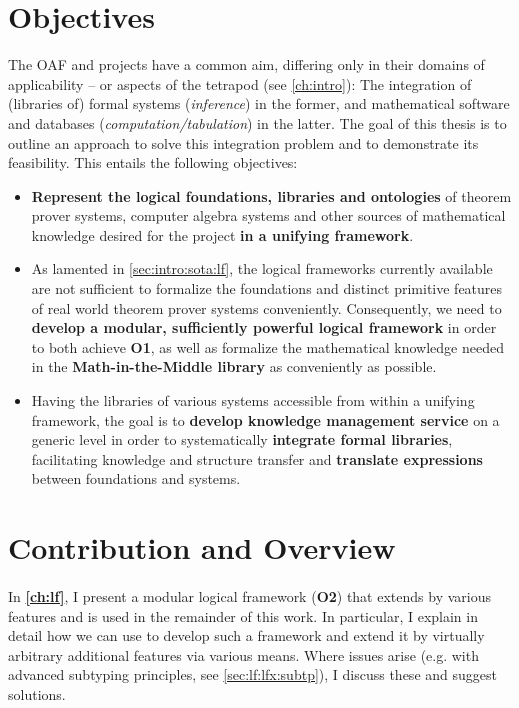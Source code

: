 \section{Objectives}\label{sec:intro:objectives}

The OAF and \ODK projects have a common aim, differing only in their domains of applicability -- or aspects of the tetrapod (see \autoref{ch:intro}): The integration of (libraries of) formal systems (\emph{inference}) in the former, and mathematical software and databases (\emph{computation/tabulation}) in the latter. The goal of this thesis is to outline an approach to solve this integration problem and to demonstrate its feasibility. This entails the following objectives:

\begin{itemize}
	\item[\textbf{O1}] \textbf{Represent the logical foundations, libraries and ontologies} of theorem prover systems, computer algebra systems and other sources of mathematical knowledge desired for the \ODK project \textbf{in a unifying framework}.
	\item[\textbf{O2}] As lamented in \autoref{sec:intro:sota:lf}, the logical frameworks currently available are not sufficient to formalize the foundations and distinct primitive features of real world theorem prover systems conveniently. Consequently, we need to \textbf{develop a modular, sufficiently powerful logical framework} in order to both achieve \textbf{O1}, as well as formalize the mathematical knowledge needed in the \textbf{Math-in-the-Middle library} as conveniently as possible.
	\item[\textbf{O3}] Having the libraries of various systems accessible from within a unifying framework, the goal is to \textbf{develop knowledge management service} on a generic level in order to systematically \textbf{integrate formal libraries}, facilitating knowledge and structure transfer and \textbf{translate expressions} between foundations and systems.
\end{itemize}

\section{Contribution and Overview}

\paragraph{} In \textbf{\autoref{ch:lf}}, I present a modular logical framework (\textbf{O2}) that extends \LF by various features and is used in the remainder of this work. In particular, I explain in detail how we can use \mmt to develop such a framework and extend it by virtually arbitrary additional features via various means. Where issues arise (e.g. with advanced subtyping principles, see \autoref{sec:lf:lfx:subtp}), I discuss these and suggest solutions.

